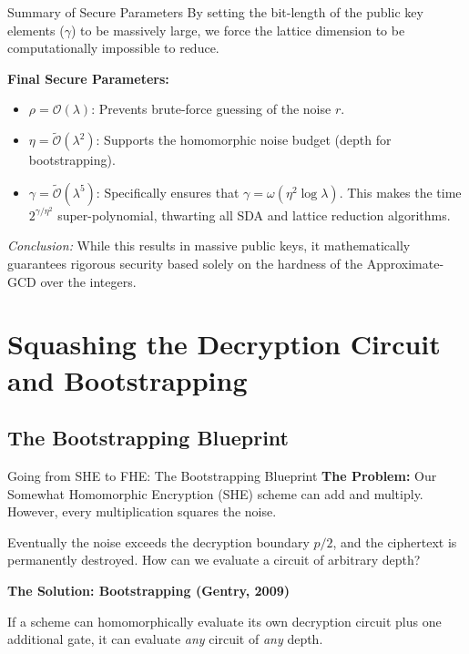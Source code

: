 \documentclass[10pt]{beamer}
\begin{document}
\begin{frame}{Summary of Secure Parameters}
    By setting the bit-length of the public key elements ($\gamma$) to be massively large, we force the lattice dimension to be computationally impossible to reduce. 
    \pause
    
    \vspace{0.3cm}
    \textbf{Final Secure Parameters:}
    \begin{itemize}
        \item $\rho = \mathcal{O}(\lambda)$: Prevents brute-force guessing of the noise $r$.
        \item $\eta = \tilde{\mathcal{O}}(\lambda^2)$: Supports the homomorphic noise budget (depth for bootstrapping).
        \item $\gamma = \tilde{\mathcal{O}}(\lambda^5)$: Specifically ensures that $\gamma = \omega(\eta^2 \log \lambda)$. This makes the time $2^{\gamma / \eta^2}$ super-polynomial, thwarting all SDA and lattice reduction algorithms.
    \end{itemize}
    \pause
    
    \vspace{0.3cm}
    \textit{Conclusion:} While this results in massive public keys, it mathematically guarantees rigorous security based solely on the hardness of the Approximate-GCD over the integers.
\end{frame}

\section{Squashing the Decryption Circuit and Bootstrapping}

\subsection{The Bootstrapping Blueprint}

\begin{frame}{Going from SHE to FHE: The Bootstrapping Blueprint}
    \textbf{The Problem:}
    Our Somewhat Homomorphic Encryption (SHE) scheme can add and multiply.
    However, every multiplication squares the noise.
    \pause

    \vspace{0.3cm}
    Eventually the noise exceeds the decryption boundary $p/2$, and the
    ciphertext is permanently destroyed.
    How can we evaluate a circuit of arbitrary depth?
    \pause

    \vspace{0.3cm}
    \textbf{The Solution: Bootstrapping (Gentry, 2009)}

    If a scheme can homomorphically evaluate its own decryption circuit
    plus one additional gate, it can evaluate \emph{any} circuit of
    \emph{any} depth.
\end{frame}
\end{document}
